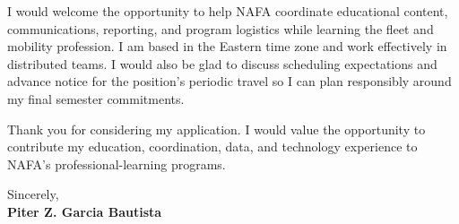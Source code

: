 \documentclass[11pt,letterpaper]{article}
\begin{document}
I would welcome the opportunity to help NAFA coordinate educational content,
communications, reporting, and program logistics while learning the fleet and
mobility profession. I am based in the Eastern time zone and work effectively
in distributed teams. I would also be glad to discuss scheduling expectations
and advance notice for the position's periodic travel so I can plan responsibly
around my final semester commitments.

Thank you for considering my application. I would value the opportunity to
contribute my education, coordination, data, and technology experience to
NAFA's professional-learning programs.

Sincerely,\\
\textbf{Piter Z. Garcia Bautista}
\end{document}
